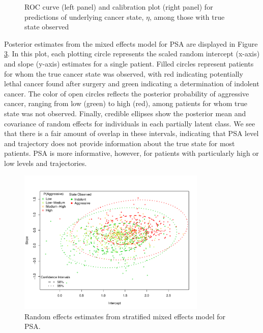 \documentclass[12pt, letterpaper]{article}
\begin{document}
\begin{figure}
\begin{center}
\begin{subfigure}[b]{0.45\textwidth}
\label{fig:calibrartion-eta}
\end{subfigure}
\caption{ROC curve (left panel) and calibration plot (right panel) for predictions of underlying cancer state, $\eta$, among those with true state observed}
\label{fig:eta-accuracy}
\end{center}
\end{figure}

Posterior estimates from the mixed effects model for PSA are displayed in Figure \ref{fig:lme}. In this plot, each plotting circle represents the scaled random intercept (x-axis) and slope (y-axis) estimates for a single patient. Filled circles represent patients for whom the true cancer state was observed, with red indicating potentially lethal cancer found after surgery and green indicating a determination of indolent cancer. The color of open circles reflects the posterior probability of aggressive cancer, ranging from low (green) to high (red), among patients for whom true state was not observed. Finally, credible ellipses show the posterior mean and covariance of random effects for individuals in each partially latent class. We see that there is a fair amount of overlap in these intervals, indicating that PSA level and trajectory does not provide information about the true state for most patients. PSA  is more informative, however, for patients with particularly high or low levels and trajectories. 

\begin{figure}
\begin{center}
\includegraphics[width=0.8\textwidth]{random-effect-est.pdf}
\caption{Random effects estimates from stratified mixed effects model for PSA.}
\label{fig:lme}
\end{center}
\end{figure}
\end{document}
